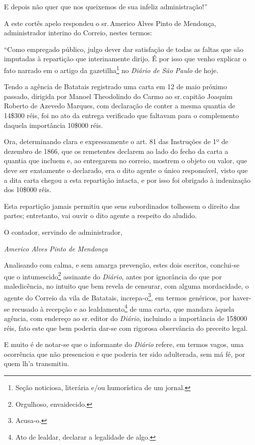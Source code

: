E depois não quer que nos queixemos de sua infeliz administração!''

A este cortês apelo respondeu o sr.\,Americo Alves Pinto de Mendonça,
administrador interino do Correio, nestes termos:

``Como empregado público, julgo dever dar satisfação de todas as faltas
que são imputadas à repartição que interinamente dirijo. É por isso que
venho explicar o fato narrado em o artigo da gazetilha\footnote{Seção
  noticiosa, literária e/ou humorística de um jornal.} no \emph{Diário
de São Paulo} de hoje.

Tendo a agência de Batatais registrado uma carta em 12 de maio próximo
passado, dirigida por Manoel Theodolindo do Carmo ao sr.\,capitão Joaquim
Roberto de Azevedo Marques, com declaração de conter a mesma quantia de
14\$300 réis, foi no ato da entrega verificado que faltavam para o
complemento daquela importância 10\$000 réis.

Ora, determinando clara e expressamente o art. 81 das Instruções de 1º
de dezembro de 1866, que os remetentes declarem ao lado do fecho da
carta a quantia que incluem e, ao entregarem no correio, mostrem o
objeto ou valor, que deve ser exatamente o declarado, era o dito agente
o único responsável, visto que a dita carta chegou a esta repartição
intacta, e por isso foi obrigado à indenização dos 10\$000 réis.

Esta repartição jamais permitiu que seus subordinados tolhessem o
direito das partes; entretanto, vai ouvir o dito agente a respeito do
aludido.

O contador, servindo de administrador,

\emph{Americo Alves Pinto de Mendonça}

Analisando com calma, e sem amarga prevenção, estes dois escritos,
conclui-se que o intumescido\footnote{Orgulhoso, envaidecido.}
assinante do \emph{Diário}, antes por ignorância do que por
maledicência, no intuito que bem revela de censurar, com alguma
mordacidade, o agente do Correio da vila de Batatais,
increpa-o\footnote{Acusa-o.}, em termos genéricos, por haver-se
recusado à recepção e ao lealdamento\footnote{Ato de lealdar, declarar
  a legalidade de algo.} de uma carta, que mandara àquela agência, com
endereço ao sr.\,editor do \emph{Diário}, incluindo a importância de
15\$000 réis, fato este que bem poderia dar-se com rigorosa observância
do preceito legal.

E muito é de notar-se que o informante do \emph{Diário} refere, em
termos vagos, uma ocorrência que não presenciou e que poderia ter sido
adulterada, sem má fé, por quem lh'a transmitiu.

